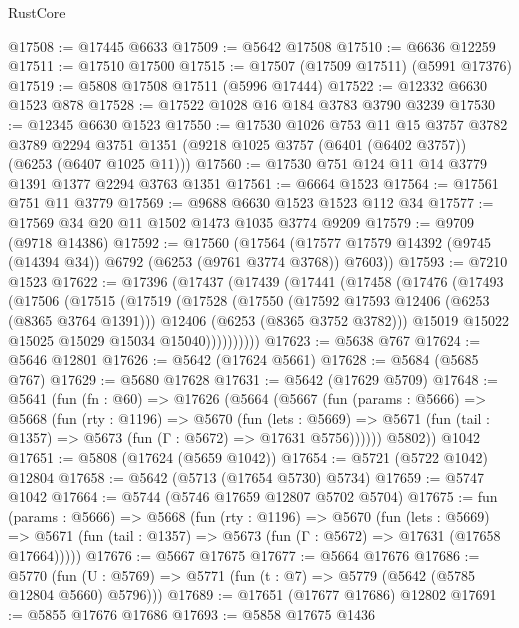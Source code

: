 \begin{lexlean}{RustCore}
\begin{coremodule}
@17508 := @17445 @6633
@17509 := @5642 @17508
@17510 := @6636 @12259
@17511 := @17510 @17500
@17515 := @17507 (@17509 @17511) (@5991 @17376)
@17519 := @5808 @17508 @17511 (@5996 @17444)
@17522 := @12332 @6630 @1523 @878
@17528 := @17522 @1028 @16 @184 @3783 @3790 @3239
@17530 := @12345 @6630 @1523
@17550 := @17530
    @1026
    @753
    @11
    @15
    @3757
    @3782
    @3789
    @2294
    @3751
    @1351
    (@9218 @1025 @3757 (@6401 (@6402 @3757)) (@6253 (@6407 @1025 @11)))
@17560 := @17530 @751 @124 @11 @14 @3779 @1391 @1377 @2294 @3763 @1351
@17561 := @6664 @1523
@17564 := @17561 @751 @11 @3779
@17569 := @9688 @6630 @1523 @1523 @112 @34
@17577 := @17569 @34 @20 @11 @1502 @1473 @1035 @3774 @9209
@17579 := @9709 (@9718 @14386)
@17592 := @17560
    (@17564 (@17577 @17579 @14392 (@9745 (@14394 @34)) @6792 (@6253 (@9761 @3774 @3768)) @7603))
@17593 := @7210 @1523
@17622 := @17396
    (@17437
      (@17439
        (@17441
          (@17458
            (@17476
              (@17493
                (@17506
                  (@17515
                    (@17519
                      (@17528
                        (@17550
                          (@17592 @17593 @12406 (@6253 (@8365 @3764 @1391)))
                          @12406
                          (@6253 (@8365 @3752 @3782)))
                        @15019
                        @15022
                        @15025
                        @15029
                        @15034
                        @15040))))))))))
@17623 := @5638 @767
@17624 := @5646 @12801
@17626 := @5642 (@17624 @5661)
@17628 := @5684 (@5685 @767)
@17629 := @5680 @17628
@17631 := @5642 (@17629 @5709)
@17648 := @5641
    (fun (fn : @60) =>
    @17626
      (@5664
        (@5667
          (fun (params : @5666) =>
          @5668
            (fun (rty : @1196) =>
            @5670
              (fun (lets : @5669) =>
              @5671 (fun (tail : @1357) => @5673 (fun (Γ : @5672) => @17631 @5756))))))
        @5802))
    @1042
@17651 := @5808 (@17624 (@5659 @1042))
@17654 := @5721 (@5722 @1042) @12804
@17658 := @5642 (@5713 (@17654 @5730) @5734)
@17659 := @5747 @1042
@17664 := @5744 (@5746 @17659 @12807 @5702 @5704)
@17675 := fun (params : @5666) =>
  @5668
    (fun (rty : @1196) =>
    @5670
      (fun (lets : @5669) =>
      @5671 (fun (tail : @1357) => @5673 (fun (Γ : @5672) => @17631 (@17658 @17664)))))
@17676 := @5667 @17675
@17677 := @5664 @17676
@17686 := @5770
    (fun (U : @5769) => @5771 (fun (t : @7) => @5779 (@5642 (@5785 @12804 @5660) @5796)))
@17689 := @17651 (@17677 @17686) @12802
@17691 := @5855 @17676 @17686
@17693 := @5858 @17675 @1436

\end{coremodule}
\end{lexlean}
